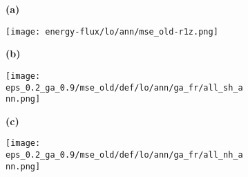 \documentclass[preview]{standalone}
\begin{document}
\begin{figure}

  \begin{subfigure}[t]{0.05\textwidth}
    \textbf{\large{(a)}}
  \end{subfigure}
  \begin{subfigure}[t]{0.95\textwidth}
    \texttt{[image: energy-flux/lo/ann/mse\_old-r1z.png]}
  \end{subfigure}


  \begin{subfigure}[t]{0.05\textwidth}
    \textbf{\large{(b)}}
  \end{subfigure}
  \begin{subfigure}[t]{0.45\textwidth}
    \texttt{[image: eps\_0.2\_ga\_0.9/mse\_old/def/lo/ann/ga\_fr/all\_sh\_ann.png]}
  \end{subfigure}
  \begin{subfigure}[t]{0.05\textwidth}
    \textbf{\large{(c)}}
  \end{subfigure}
  \begin{subfigure}[t]{0.45\textwidth}
    \texttt{[image: eps\_0.2\_ga\_0.9/mse\_old/def/lo/ann/ga\_fr/all\_nh\_ann.png]}
  \end{subfigure}

\end{figure}
\end{document}

